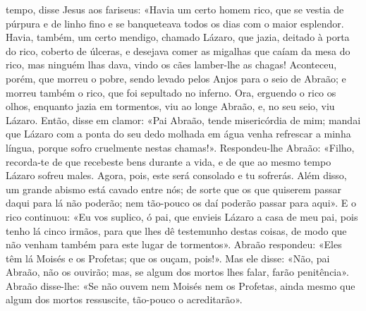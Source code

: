 \begin{paracol}{2}
{ tempo, disse Jesus aos fariseus: «Havia um certo homem rico, que se vestia de púrpura e de linho fino e se banqueteava todos os dias com o maior esplendor. Havia, também, um certo mendigo, chamado Lázaro, que jazia, deitado à porta do rico, coberto de úlceras, e desejava comer as migalhas que caíam da mesa do rico, mas ninguém lhas dava, vindo os cães lamber-lhe as chagas! Aconteceu, porém, que morreu o pobre, sendo levado pelos Anjos para o seio de Abraão; e morreu também o rico, que foi sepultado no inferno. Ora, erguendo o rico os olhos, enquanto jazia em tormentos, viu ao longe Abraão, e, no seu seio, viu Lázaro. Então, disse em clamor: «Pai Abraão, tende misericórdia de mim; mandai que Lázaro com a ponta do seu dedo molhada em água venha refrescar a minha língua, porque sofro cruelmente nestas chamas!». Respondeu-lhe Abraão: «Filho, recorda-te de que recebeste bens durante a vida, e de que ao mesmo tempo Lázaro sofreu males. Agora, pois, este será consolado e tu sofrerás. Além disso, um grande abismo está cavado entre nós; de sorte que os que quiserem passar daqui para lá não poderão; nem tão-pouco os daí poderão passar para aqui». E o rico continuou: «Eu vos suplico, ó pai, que envieis Lázaro a casa de meu pai, pois tenho lá cinco irmãos, para que lhes dê testemunho destas coisas, de modo que não venham também para este lugar de tormentos». Abraão respondeu: «Eles têm lá Moisés e os Profetas; que os ouçam, pois!». Mas ele disse: «Não, pai Abraão, não os ouvirão; mas, se algum dos mortos lhes falar, farão penitência». Abraão disse-lhe: «Se não ouvem nem Moisés nem os Profetas, ainda mesmo que algum dos mortos ressuscite, tão-pouco o acreditarão».
}\end{paracol}

\begin{paracol}{2}\switchcolumn{}\end{paracol}

